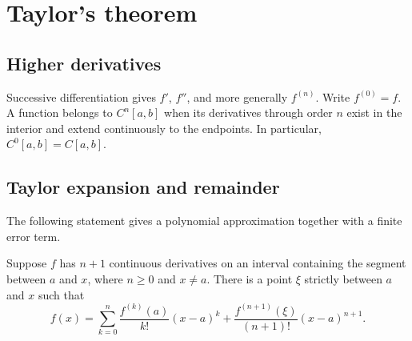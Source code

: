 \section{Taylor's theorem}
\label{sec:analysis-i:taylor-theorem}


\subsection{Higher derivatives}
Successive differentiation gives $f'$, $f''$, and more generally $f^{(n)}$.
Write $f^{(0)}=f$. A function belongs to $C^n[a,b]$
when its derivatives through order $n$ exist in the interior and extend
continuously to the endpoints. In particular, $C^0[a,b]=C[a,b]$.

\subsection{Taylor expansion and remainder}
The following statement gives a polynomial approximation together with a
finite error term.

\begin{theorem}
  \label{thm:analysis-i:taylor-lagrange}
  Suppose $f$ has $n+1$ continuous derivatives on an interval containing
  the segment between $a$ and $x$, where $n\geq0$ and $x\ne a$.
  There is a point $\xi$ strictly between $a$ and $x$ such that
  \[
    f(x)=\sum_{k=0}^{n}\frac{f^{(k)}(a)}{k!}(x-a)^k
      +\frac{f^{(n+1)}(\xi)}{(n+1)!}(x-a)^{n+1}.
  \]
\end{theorem}



